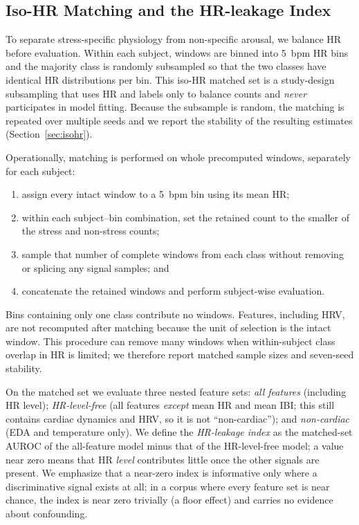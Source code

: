 \documentclass[healthcare,article,submit,moreauthors,pdftex]{Definitions/mdpi}
\begin{document}
\subsection{Iso-HR Matching and the HR-leakage Index}

To separate stress-specific physiology from non-specific arousal, we balance HR
before evaluation. Within each subject, windows are binned into 5~bpm HR bins and
the majority class is randomly subsampled so that the two classes have identical
HR distributions per bin. This iso-HR matched set is a study-design subsampling
that uses HR and labels only to balance counts and \emph{never} participates in
model fitting. Because the subsample is random, the matching is repeated over
multiple seeds and we report the stability of the resulting estimates
(Section~\ref{sec:isohr}).

Operationally, matching is performed on whole precomputed windows, separately
for each subject:
\begin{enumerate}
\item assign every intact window to a 5~bpm bin using its mean HR;
\item within each subject--bin combination, set the retained count to the
smaller of the stress and non-stress counts;
\item sample that number of complete windows from each class without removing
or splicing any signal samples; and
\item concatenate the retained windows and perform subject-wise evaluation.
\end{enumerate}
Bins containing only one class contribute no windows. Features, including HRV,
are not recomputed after matching because the unit of selection is the intact
window. This procedure can remove many windows when within-subject class overlap
in HR is limited; we therefore report matched sample sizes and seven-seed
stability.

On the matched set we evaluate three nested feature sets: \emph{all features}
(including HR level); \emph{HR-level-free} (all features \emph{except} mean HR and
mean IBI; this still contains cardiac dynamics and HRV, so it is not
``non-cardiac''); and \emph{non-cardiac} (EDA and temperature only). We define the
\emph{HR-leakage index} as the matched-set AUROC of the all-feature model minus
that of the HR-level-free model; a value near zero means that HR \emph{level}
contributes little once the other signals are present. We emphasize that a
near-zero index is informative only where a discriminative signal exists at all;
in a corpus where every feature set is near chance, the index is near zero
trivially (a floor effect) and carries no evidence about confounding.
\end{document}

